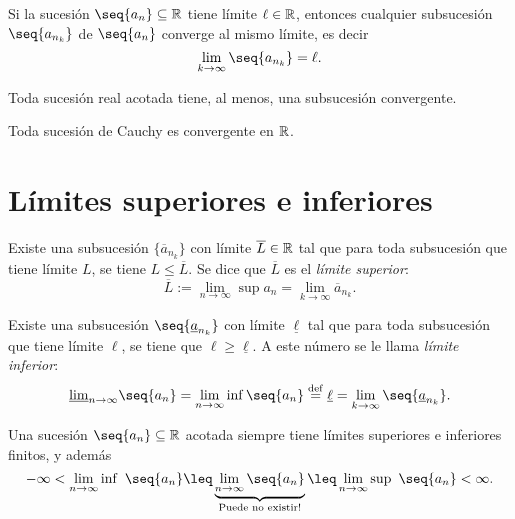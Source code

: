 \begin{prop}
    Si la sucesión $\seq{a_n}\subseteq\R$ tiene límite $\ell\in\mathbb{R}$, entonces cualquier subsucesión $\seq{a_{n_k}}$ de $\seq{a_n}$
    converge al mismo límite, es decir
    \begin{equation}
        \lim_{k\to\infty} \seq{a_{n_k}} = \ell.
    \end{equation}
\end{prop}

\begin{theorem}
    Toda sucesión real acotada tiene, al menos, una subsucesión convergente.
\end{theorem}

\begin{coro}
    Toda sucesión de Cauchy es convergente en $\mathbb{R}$.
\end{coro}

\section{Límites superiores e inferiores}
\begin{defi}
    Existe una subsucesión $\{\overline{a}_{n_k}\} $ con límite
    $\overline{L}\in\mathbb{R}$ tal que para toda subsucesión que tiene límite $L$, se tiene $L\leq
    \overline{L}$. Se dice que $\overline{L}$ es el \textit{límite superior}:
    \begin{equation}
        \overline{L} := \lim_{n\to\infty}\sup a_n = \lim_{k\to\infty}\overline{a}_{n_k}.
    \end{equation}
\end{defi}

\begin{defi}
    Existe una subsucesión $\seq{\underline{a}_{n_k}} $ con límite $\underline{\ell}$ tal que para toda subsucesión que tiene límite $\ell$, se tiene que $\ell \geq\underline{\ell}$. A este
    número se le llama \textit{límite inferior}:
    \begin{equation}
        \underline{\lim}_{n\to\infty} \seq{a_n} = \lim_{n\to\infty}\inf \seq{a_n} \overset{\mathrm{def}}{=}
        \underline{\ell} = \lim_{k\to\infty}\seq{\underline{a}_{n_k}}.
    \end{equation}
\end{defi}

\begin{remark}
    Una sucesión $\seq{a_n}\subseteq\R$ acotada siempre tiene límites superiores e inferiores finitos, y además
    \begin{equation}
        -\infty < \lim_{n\to\infty}\inf\ \seq{a_n} \leq \underbrace{\lim_{n\to\infty}\seq{a_n}}_{\textrm{Puede no existir!}} \leq \lim_{n\to\infty}\sup\ \seq{a_n} < \infty.
    \end{equation}
\end{remark}

